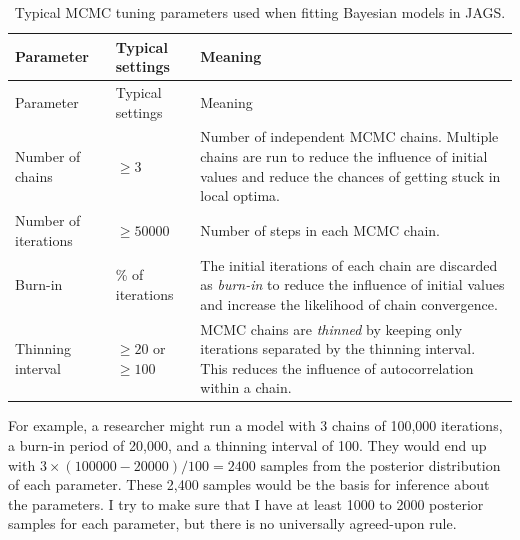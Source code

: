 \documentclass[
  13,
  letterpaper,
]{report}
\begin{document}
\begin{longtable}[]{@{}
  >{\raggedright\arraybackslash}p{}
  >{\centering\arraybackslash}p{}
  >{\raggedright\arraybackslash}p{}@{}}
\caption{Typical MCMC tuning parameters used when fitting Bayesian
models in JAGS.}\label{tbl-mcmc-parameters}\tabularnewline
\toprule\noalign{}
\begin{minipage}[b]{\linewidth}\raggedright
Parameter
\end{minipage} & \begin{minipage}[b]{\linewidth}\centering
Typical settings
\end{minipage} & \begin{minipage}[b]{\linewidth}\raggedright
Meaning
\end{minipage} \\
\midrule\noalign{}
\endfirsthead
\toprule\noalign{}
\begin{minipage}[b]{\linewidth}\raggedright
Parameter
\end{minipage} & \begin{minipage}[b]{\linewidth}\centering
Typical settings
\end{minipage} & \begin{minipage}[b]{\linewidth}\raggedright
Meaning
\end{minipage} \\
\midrule\noalign{}
\endhead
\bottomrule\noalign{}
\endlastfoot
Number of chains & \(\geq3\) & Number of independent MCMC chains.
Multiple chains are run to reduce the influence of initial values and
reduce the chances of getting stuck in local optima. \\
Number of iterations & \(\geq50000\) & Number of steps in each MCMC
chain. \\
Burn-in & 20\% of iterations & The initial iterations of each chain are
discarded as \emph{burn-in} to reduce the influence of initial values
and increase the likelihood of chain convergence. \\
Thinning interval & \(\geq20\) or \(\geq100\) & MCMC chains are
\emph{thinned} by keeping only iterations separated by the thinning
interval. This reduces the influence of autocorrelation within a
chain. \\
\end{longtable}

For example, a researcher might run a model with 3 chains of 100,000
iterations, a burn-in period of 20,000, and a thinning interval of 100.
They would end up with \(3\times(100000-20000) / 100 = 2400\) samples
from the posterior distribution of each parameter. These 2,400 samples
would be the basis for inference about the parameters. I try to make
sure that I have at least 1000 to 2000 posterior samples for each
parameter, but there is no universally agreed-upon rule.
\end{document}
